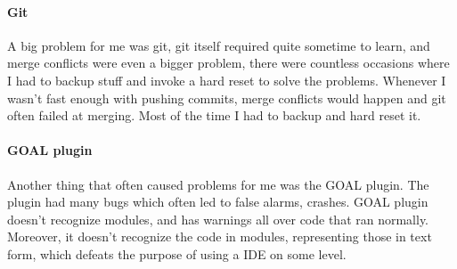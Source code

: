 \paragraph{Git}
A big problem for me was git, git itself required quite sometime to learn, and merge conflicts were even a bigger problem, there were countless occasions where I had to backup stuff and invoke a hard reset to solve the problems. Whenever I wasn't fast enough with pushing commits, merge conflicts would happen and git often failed at merging. Most of the time I had to backup and hard reset it.
\paragraph{GOAL plugin}
Another thing that often caused problems for me was the GOAL plugin. The plugin had many bugs which often led to false alarms, crashes. GOAL plugin doesn't recognize modules, and has warnings all over code that ran normally. Moreover, it doesn't recognize the code in modules, representing those in text form, which defeats the purpose of using a IDE on some level.
